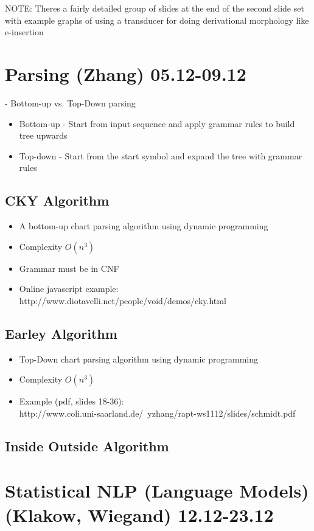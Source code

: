 \documentclass[11pt]{article}
\newenvironment{itemise}{
\begin{itemize}
  \setlength{\itemsep}{1pt}
  \setlength{\parskip}{0pt}
  \setlength{\parsep}{0pt}
}{\end{itemize}}
\begin{document}
NOTE: Theres a fairly detailed group of slides at the end of the second slide set with example graphs  of using a transducer for doing derivational morphology like e-insertion


\newpage\section{Parsing (Zhang) 05.12-09.12}

- Bottom-up vs. Top-Down parsing
\begin{itemise}
 \item Bottom-up - Start from input sequence and apply grammar rules to build tree upwards
 \item Top-down - Start from the start symbol and expand the tree with grammar rules
\end{itemise}
\subsection{ CKY Algorithm }
\begin{itemise}
 \item A bottom-up chart parsing algorithm using dynamic programming
 \item Complexity $O(n^3)$ 
 \item Grammar must be in CNF
 \item Online javascript example: http://www.diotavelli.net/people/void/demos/cky.html
\end{itemise}
\subsection{ Earley Algorithm }
\begin{itemise}
 \item Top-Down chart parsing algorithm using dynamic programming
 \item Complexity $O(n^3)$
 \item Example (pdf, slides 18-36): \\http://www.coli.uni-saarland.de/~yzhang/rapt-ws1112/slides/schmidt.pdf
\end{itemise}
\subsection { Inside Outside Algorithm }



\newpage\section{Statistical NLP (Language Models) (Klakow, Wiegand) 12.12-23.12}
\end{document}
